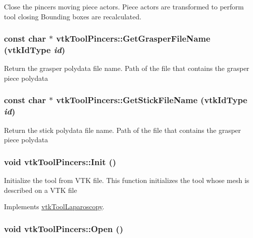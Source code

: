 Close the pincers moving piece actors. Piece actors are transformed to perform tool closing Bounding boxes are recalculated. \hypertarget{classvtkToolPincers_a1f673edc2bee876530a721833f1c77f1}{
\subsubsection[{GetGrasperFileName}]{\setlength{\rightskip}{0pt plus 5cm}const char $\ast$ vtkToolPincers::GetGrasperFileName (vtkIdType {\em id})}}
\label{classvtkToolPincers_a1f673edc2bee876530a721833f1c77f1}


Return the grasper polydata file name. Path of the file that contains the grasper piece polydata \hypertarget{classvtkToolPincers_acb1210b1b77be2a7030b05c3b9e63ff5}{
\subsubsection[{GetStickFileName}]{\setlength{\rightskip}{0pt plus 5cm}const char $\ast$ vtkToolPincers::GetStickFileName (vtkIdType {\em id})}}
\label{classvtkToolPincers_acb1210b1b77be2a7030b05c3b9e63ff5}


Return the stick polydata file name. Path of the file that contains the grasper piece polydata \hypertarget{classvtkToolPincers_ae4918610073324c94dddd8da234742a9}{
\subsubsection[{Init}]{\setlength{\rightskip}{0pt plus 5cm}void vtkToolPincers::Init ()}}
\label{classvtkToolPincers_ae4918610073324c94dddd8da234742a9}


Initialize the tool from VTK file. This function initializes the tool whose mesh is described on a VTK file 

Implements \hyperlink{classvtkToolLaparoscopy_ace75ea21a3ddb27547976ddea0ebb60e}{vtkToolLaparoscopy}.\hypertarget{classvtkToolPincers_a0a0d2fdd1ac4ccc1823de3969a0aa45d}{
\subsubsection[{Open}]{\setlength{\rightskip}{0pt plus 5cm}void vtkToolPincers::Open ()}}
\label{classvtkToolPincers_a0a0d2fdd1ac4ccc1823de3969a0aa45d}


